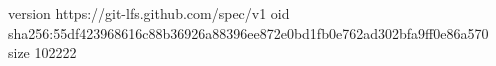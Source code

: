 version https://git-lfs.github.com/spec/v1
oid sha256:55df423968616c88b36926a88396ee872e0bd1fb0e762ad302bfa9ff0e86a570
size 102222
